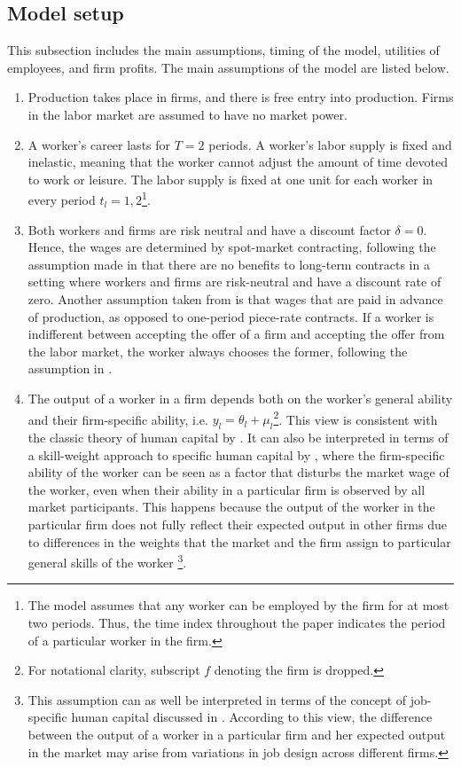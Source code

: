 \documentclass[12pt]{article}
\begin{document}
\subsection{Model setup}
This subsection includes the main assumptions, timing of the model, utilities of employees, and firm profits. The main assumptions of the model are listed below.
\begin{enumerate}[label={A}{\arabic*}.]
	\item Production takes place in firms, and there is free entry into production. Firms in the labor market are assumed to have no market power.
	\item A worker's career lasts for $T = 2$ periods. A worker's labor supply is fixed and inelastic, meaning that the worker cannot adjust the amount of time devoted to work or leisure. The labor supply is fixed at one unit for each worker in every period $t_l = 1,2$\footnote{The model assumes that any worker can be employed by the firm for at most two periods. Thus, the time index throughout the paper indicates the period of a particular worker in the firm.}.
	\item Both workers and firms are risk neutral and have a discount factor $\delta = 0$. Hence, the wages are determined by spot-market contracting, following the assumption made in \cite{gibbons1999theory} that there are no benefits to long-term contracts in a setting where workers and firms are risk-neutral and have a discount rate of zero. Another assumption taken from \cite{gibbons1999theory} is that wages that are paid in advance of production, as opposed to one-period piece-rate contracts. If a worker is indifferent between accepting the offer of a firm and accepting the offer from the labor market, the worker always chooses the former, following the assumption in \cite{ekinci2016employee}.
    \item The output of a worker in a firm depends both on the worker's general ability and their firm-specific ability, i.e. $y_{l} = \theta_l + \mu_l$\footnote{For notational clarity, subscript $f$ denoting the firm is dropped.}. This view is consistent with the classic theory of human capital by \cite{becker1962investment}. It can also be interpreted in terms of a skill-weight approach to specific human capital by \cite{lazear2009firm}, where the firm-specific ability of the worker can be seen as a factor that disturbs the market wage of the worker, even when their ability in a particular firm is observed by all market participants. This happens because the output of the worker in the particular firm does not fully reflect their expected output in other firms due to differences in the weights that the market and the firm assign to particular general skills of the worker \footnote{This assumption can as well be interpreted in terms of the concept of job-specific human capital discussed in \cite{gibbons2004task}. According to this view, the difference between the output of a worker in a particular firm and her expected output in the market may arise from variations in job design across different firms.}. 

\end{enumerate}
\end{document}
